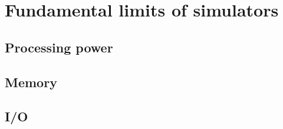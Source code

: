 \chapter{Fundamental limits of simulators} \label{limits}
\section{Processing power} \label{limits-cpu}
\section{Memory} \label{limits-mem}
\section{I/O} \label{limits-io}